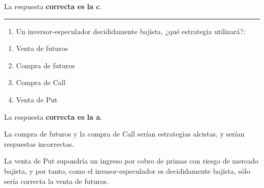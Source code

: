 \documentclass[
  letterpaper,
  DIV=11,
  numbers=noendperiod]{scrreprt}
\providecommand{\tightlist}{%
  \setlength{\itemsep}{0pt}\setlength{\parskip}{0pt}}\usepackage{longtable,booktabs,array}
\begin{document}
\begin{tcolorbox}[enhanced jigsaw, left=2mm, opacityback=0, colback=white, breakable, arc=.35mm, bottomrule=.15mm, rightrule=.15mm, toprule=.15mm, leftrule=.75mm, colframe=quarto-callout-tip-color-frame]
\begin{minipage}[t]{5.5mm}
\textcolor{quarto-callout-tip-color}{\faLightbulb}
\end{minipage}%
\begin{minipage}[t]{\textwidth - 5.5mm}

La respuesta \textbf{correcta es la c}.

\end{minipage}%
\end{tcolorbox}

\begin{center}\rule{0.5\linewidth}{0.5pt}\end{center}

\begin{enumerate}
\def\labelenumi{\arabic{enumi}.}
\setcounter{enumi}{60}
\tightlist
\item
  Un inversor-especulador decididamente bajista, ¿qué estrategia
  utilizará?:
\end{enumerate}

\begin{enumerate}
\def\labelenumi{\alph{enumi})}
\item
  Venta de futuros
\item
  Compra de futuros
\item
  Compra de Call
\item
  Venta de Put
\end{enumerate}

\begin{tcolorbox}[enhanced jigsaw, left=2mm, opacityback=0, colback=white, breakable, arc=.35mm, bottomrule=.15mm, rightrule=.15mm, toprule=.15mm, leftrule=.75mm, colframe=quarto-callout-tip-color-frame]
\begin{minipage}[t]{5.5mm}
\textcolor{quarto-callout-tip-color}{\faLightbulb}
\end{minipage}%
\begin{minipage}[t]{\textwidth - 5.5mm}

La respuesta \textbf{correcta es la a}.

La compra de futuros y la compra de Call serían estrategias alcistas, y
serían respuestas incorrectas.

La venta de Put supondría un ingreso por cobro de primas con riesgo de
mercado bajista, y por tanto, como el invasor-especulador es
decididamente bajista, sólo sería correcta la venta de futuros.

\end{minipage}%
\end{tcolorbox}
\end{document}
